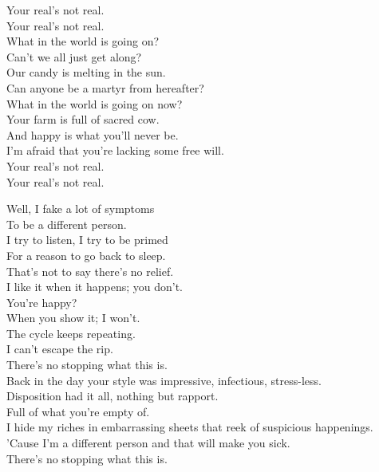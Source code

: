 Your real's not real. \\
Your real's not real. \\

What in the world is going on? \\
Can't we all just get along? \\
Our candy is melting in the sun. \\
Can anyone be a martyr from hereafter? \\
What in the world is going on now? \\
Your farm is full of sacred cow. \\
And happy is what you'll never be. \\
I'm afraid that you're lacking some free will. \\

Your real's not real. \\
Your real's not real.  \\




Well, I fake a lot of symptoms \\
To be a different person. \\
I try to listen, I try to be primed \\
For a reason to go back to sleep. \\
That's not to say there's no relief. \\
I like it when it happens; you don't. \\
You're happy? \\
When you show it; I won't. \\
The cycle keeps repeating. \\
I can't escape the rip. \\
There's no stopping what this is. \\

Back in the day your style was impressive, infectious, stress-less. \\
Disposition had it all, nothing but rapport. \\
Full of what you're empty of. \\
I hide my riches in embarrassing sheets that reek of suspicious happenings. \\
'Cause I'm a different person and that will make you sick. \\
There's no stopping what this is. \\

